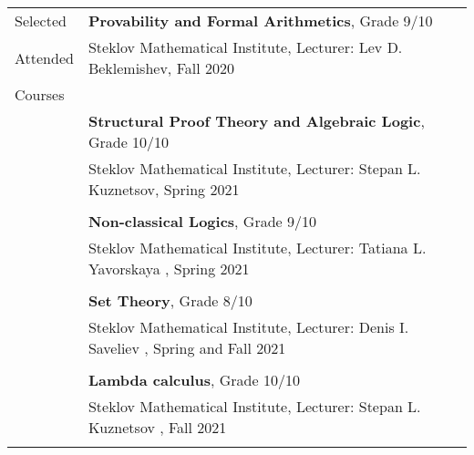 \documentclass[letterpaper,11pt,oneside]{article}
\begin{document}
\begin{tabular}{p{4cm} p{15cm}}  
    \Large{Selected} & \textbf{Provability and Formal Arithmetics}, Grade 9/10\\
    \Large{Attended} & Steklov Mathematical Institute, Lecturer: Lev D. Beklemishev, Fall 2020 \\
    \Large{Courses}  & \\
    & \textbf{Structural Proof Theory and Algebraic Logic}, Grade 10/10\\ 
    & Steklov Mathematical Institute, Lecturer: Stepan L. Kuznetsov, Spring 2021\\\\
    & \textbf{Non-classical Logics}, Grade 9/10\\ 
    & Steklov Mathematical Institute, Lecturer: Tatiana L. Yavorskaya
    , Spring 2021\\\\
    & \textbf{Set Theory}, Grade 8/10\\ 
    & Steklov Mathematical Institute, Lecturer: Denis I. Saveliev
    , Spring and Fall 2021\\\\
    & \textbf{Lambda calculus}, Grade 10/10\\ 
    & Steklov Mathematical Institute, Lecturer: Stepan L. Kuznetsov
    , Fall 2021
    \\\\
\end{tabular}
\end{document}
